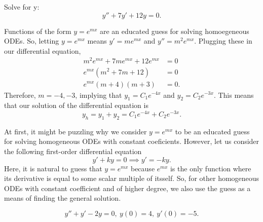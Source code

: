 \begin{example}
    Solve for y:  $$y''+7y'+12y=0.$$ 
\end{example}
\begin{soln}
    Functions of the
    form $y=e^{mx}$ are an educated guess for solving homoegeneous ODEs. So,
    letting $y=e^{mx}$ means $y' = me^{mx}$ and $y''= m^2e^{mx}$. Plugging
    these in our differential equation,
    \begin{align*}
        m^2e^{mx}+7me^{mx}+12e^{mx}&=0 \\
        e^{mx}\left(m^2+7m+12\right)&=0 \\
        e^{mx}(m+4)(m+3) &= 0.
    \end{align*}
    Therefore, $m=-4,-3$, implying that $y_1=C_1e^{-4x}$ and $y_2=C_2e^{-3x}$. 
    This means that our solution of the differential
    equation is $$y_h = y_1+y_2 =  C_1e^{-4x} + C_2e^{-3x}.$$
\end{soln}

At first, it might be puzzling why we consider $y=e^{mx}$ to be an educated
guess for solving homogeneous ODEs with constant coeficients. However, let us
consider the following first-order differential equation 
$$y'+ky=0 \implies y' = -ky.$$ Here, it is natural to guess that $y=e^{mx}$
because $e^{mx}$ is the only function where its derivative is equal to some
scalar multiple of itsself. So, for other homogeneous ODEs with constant
coefficient and of higher degree, we also use the guess as a means
of finding the general solution.
\begin{exercise}
    $$y''+y'-2y=0,~y(0) = 4,~y'(0)=-5.$$
\end{exercise}

